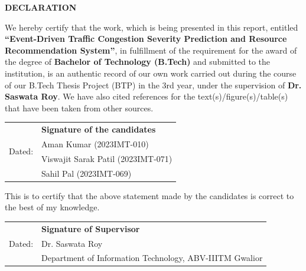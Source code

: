 
\begin{center}
{\Large \bf DECLARATION}
\end{center}
\vspace{0.5cm}
\noindent We hereby certify that the work, which is being presented in this report, entitled \textbf{``Event-Driven Traffic Congestion Severity Prediction and Resource Recommendation System''}, in fulfillment of the requirement for the award of the degree of \textbf{Bachelor of Technology (B.Tech)} and submitted to the institution, is an authentic record of our own work carried out during the course of our B.Tech Thesis Project (BTP) in the 3rd year, under the supervision of \textbf{Dr. Saswata Roy}. We have also cited references for the text(s)/figure(s)/table(s) that have been taken from other sources.

\vspace{1cm}

\begin{center}
	\begin{tabular}{p{}p{}}
		\multirow{4}{*}{Dated:} & {\bf{Signature of the candidates}} \\
		 & Aman Kumar (2023IMT-010) \\
		 & Viswajit Sarak Patil (2023IMT-071) \\
		 & Sahil Pal (2023IMT-069) \\
	\end{tabular}
\end{center}
\vspace{1.5cm}
\noindent This is to certify that the above statement made by the candidates is correct to the best of my knowledge.

\vspace{1.5cm}

\begin{center}
	\begin{tabular}{p{}p{}}
		\multirow{3}{*}{Dated:} & {\bf{Signature of Supervisor}} \\
		 & Dr. Saswata Roy \\
		 & Department of Information Technology, ABV-IIITM Gwalior \\
	\end{tabular}
\end{center}
